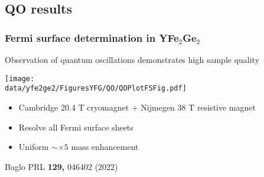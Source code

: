 \subsection{QO results}
%
%
%
%


\begin{emptyframe}
\frametitle{Fermi surface determination in YFe$_2$Ge$_2$}

\centerline{Observation of quantum oscillations demonstrates high sample quality}
\vspace{1em}

\texttt{[image: \\data/yfe2ge2/FiguresYFG/QO/QOPlotFSFig.pdf]}
\vspace{0.5em}
\begin{itemize}
\item Cambridge 20.4 T cryomagnet + Nijmegen 38 T resistive magnet
\item Resolve all Fermi surface sheets
\item Uniform $\sim \times 5$ mass enhancement
\end{itemize}

\vspace*{\fill}
\centerline{\makebox[\linewidth]{\rule{0.85\textwidth}{0.4pt}}}
\centerline{\scriptsize {Baglo PRL {\bf 129,} 046402 (2022)}}
\end{emptyframe}
{}

